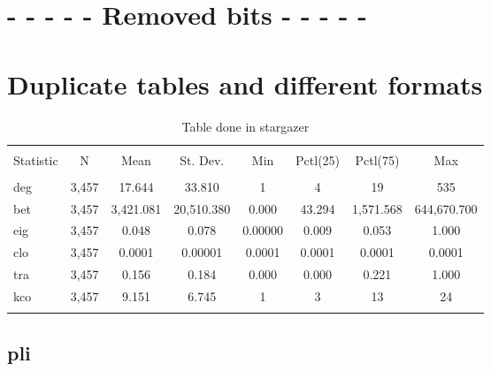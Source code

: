 \section{- - - - - Removed bits - - - - -}




\section{Duplicate tables and different formats}
\begin{table}[!htbp] \centering 
\begin{tabular}{@{\extracolsep{5pt}}lccccccc} 
\\[-1.8ex]\hline 
\hline \\[-1.8ex] 
Statistic & \multicolumn{1}{c}{N} & \multicolumn{1}{c}{Mean} & \multicolumn{1}{c}{St. Dev.} & \multicolumn{1}{c}{Min} & \multicolumn{1}{c}{Pctl(25)} & \multicolumn{1}{c}{Pctl(75)} & \multicolumn{1}{c}{Max} \\ 
\hline \\[-1.8ex] 
deg & 3,457 & 17.644 & 33.810 & 1 & 4 & 19 & 535 \\ 
bet & 3,457 & 3,421.081 & 20,510.380 & 0.000 & 43.294 & 1,571.568 & 644,670.700 \\ 
eig & 3,457 & 0.048 & 0.078 & 0.00000 & 0.009 & 0.053 & 1.000 \\ 
clo & 3,457 & 0.0001 & 0.00001 & 0.0001 & 0.0001 & 0.0001 & 0.0001 \\ 
tra & 3,457 & 0.156 & 0.184 & 0.000 & 0.000 & 0.221 & 1.000 \\ 
kco & 3,457 & 9.151 & 6.745 & 1 & 3 & 13 & 24 \\ 
\hline \\[-1.8ex] 
\end{tabular} 
\caption{Table done in stargazer}



\end{table} 


\subsection{pli}
